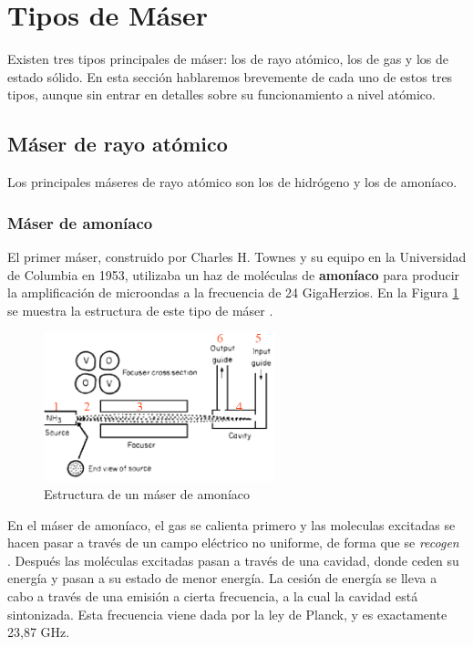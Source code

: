 \section{Tipos de M\'aser}
\label{tipos}

Existen tres tipos principales de m\'aser: los de rayo at\'omico, los de gas y los de estado s\'olido. En esta secci\'on hablaremos brevemente de cada uno de estos tres tipos, aunque sin entrar en detalles sobre su funcionamiento a nivel at\'omico.

\subsection{M\'aser de rayo at\'omico}

Los principales m\'aseres de rayo at\'omico son los de hidr\'ogeno y los de amon\'iaco.

\subsubsection{M\'aser de amon\'iaco}

El primer m\'aser, construido por Charles H. Townes y su equipo en la Universidad de Columbia en 1953, utilizaba un haz de mol\'eculas de \textbf{amon\'iaco} para producir la amplificaci\'on de microondas a la frecuencia de 24 GigaHerzios. En la Figura \ref{fig:maser_amoniaco} se muestra la estructura de este tipo de m\'aser \cite{AmoniaMaser}.

\begin{figure}[ht!]
 \centering
 \includegraphics[width=0.6\textwidth]{./Utils/maser_amoniaco.png}
 \caption{Estructura de un m\'aser de amon\'iaco}
 \label{fig:maser_amoniaco}
\end{figure}

En el m\'aser de amon\'iaco, el gas se calienta primero y las moleculas excitadas se hacen pasar a trav\'es de un campo el\'ectrico no uniforme, de forma que se \textit{recogen} \cite{ElectroAplicado}. Despu\'es las mol\'eculas excitadas pasan a trav\'es de una cavidad, donde ceden su energ\'ia y pasan a su estado de menor energ\'ia. La cesi\'on de energ\'ia se lleva a cabo a trav\'es de una emisi\'on a cierta frecuencia, a la cual la cavidad est\'a sintonizada. Esta frecuencia viene dada por la ley de Planck, y es exactamente 23,87 GHz.




